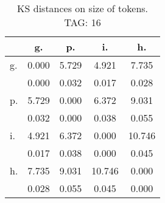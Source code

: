\begin{table}[h!]
\begin{center}
\begin{tabular}{| l | c | c | c | c |}\hline
 & g. & p. & i. & h. \\\hline
g. & 0.000  & 5.729  & 4.921  & 7.735 \\\hline
 & 0.000  & 0.032  & 0.017  & 0.028 \\\hline
p. & 5.729  & 0.000  & 6.372  & 9.031 \\\hline
 & 0.032  & 0.000  & 0.038  & 0.055 \\\hline
i. & 4.921  & 6.372  & 0.000  & 10.746 \\\hline
 & 0.017  & 0.038  & 0.000  & 0.045 \\\hline
h. & 7.735  & 9.031  & 10.746  & 0.000 \\\hline
 & 0.028  & 0.055  & 0.045  & 0.000 \\\hline
\end{tabular}
\caption{KS distances on size of tokens. TAG: 16}
\end{center}
\end{table}